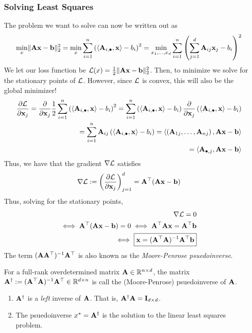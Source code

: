     \subsubsection{Solving Least Squares}
        The problem we want to solve can now be written out as
        \begin{align*}
            \min_x \lVert \mathbf{A}\mathbf{x} - {\bf b} \rVert_2^2 = \min_x \sum_{i=1}^n \left( \langle \mathbf{A}_{i, \bullet}, \mathbf{x} \rangle - b_i\right)^2 = \min_{x_1, \dots, x_d} \sum_{i =1}^n \left( \sum_{j = 1}^d \mathbf{A}_{ij}\mathbf{x}_j - b_i \right)^2
        \end{align*}
        We let our loss function be $\mathcal{L}(x) = \frac{1}{2} \lVert \mathbf{A}\mathbf{x} - {\bf b} \rVert_2^2$. Then, to minimize we solve for the stationary points of $\mathcal{L}$. However, since $\mathcal{L}$ is convex, this will also be the global minimizer!
        \begin{align*}
            \frac{\partial \mathcal{L}}{\partial \mathbf{x}_j} = \frac{\partial}{\partial \mathbf{x}_j} \frac{1}{2} \sum_{i = 1}^n \left( \langle \mathbf{A}_{i, \bullet}, \mathbf{x} \rangle - b_i \right)^2 
            = \sum_{i = 1}^n \left( \langle \mathbf{A}_{i, \bullet}, \mathbf{x} \rangle - b_i \right) \frac{\partial}{\partial \mathbf{x}_j} \left( \langle \mathbf{A}_{i, \bullet}, \mathbf{x} \rangle - b_i \right) \\
            =  \sum_{i = 1}^n \mathbf{A}_{ij} \left( \langle \mathbf{A}_{i, \bullet}, \mathbf{x} \rangle - b_i \right) = \langle \left( \mathbf{A}_{1j}, \dots, \mathbf{A}_{nj} \right), \mathbf{A}\mathbf{x} - {\bf b} \rangle \\ = \langle \mathbf{A}_{\bullet, j}, \mathbf{A}\mathbf{x} - {\bf b} \rangle
        \end{align*}
        Thus, we have that the gradient $\nabla \mathcal{L}$ satisfies
        \begin{equation}
        \label{eqn:leastsq:grad}
            \nabla \mathcal{L} := \left( \frac{\partial \mathcal{L}}{\partial \mathbf{x}_j}\right)_{j = 1}^d = \mathbf{A}^\top(\mathbf{A}\mathbf{x} - {\bf b})
        \end{equation}
        Thus, solving for the stationary points,
        \begin{align*}
            \nabla \mathcal{L} = 0 \\
            \iff \mathbf{A}^\top (\mathbf{A}\mathbf{x} - {\bf b}) = 0 \iff \mathbf{A}^\top \mathbf{A}\mathbf{x} = \mathbf{A}^\top {\bf b} \\
            \iff \boxed{\mathbf{x} = (\mathbf{A}^\top \mathbf{A})^{-1} \mathbf{A}^\top {\bf b}}
        \end{align*}
        The term $(\mathbf{A} \mathbf{A}^\top)^{-1}\mathbf{A}^\top$ is also known as the {\em Moore-Penrose psuedoinverse}.
        \begin{defn}
        For a full-rank overdetermined matrix $\mathbf{A} \in \mathbb{R}^{n \times d}$, the matrix $\mathbf{A}^\dagger := (\mathbf{A}^\top \mathbf{A})^{-1}\mathbf{A}^\top \in \mathbb{R}^{d \times n}$ is call the (Moore-Penrose) psuedoinverse of $\mathbf{A}$.
        \begin{enumerate}
            \item $\mathbf{A}^\dagger$ is a {\em left} inverse of $\mathbf{A}$. That is, $\mathbf{A}^\dagger \mathbf{A} = \mathbf{I}_{d \times d}$.
            \item The psuedoinverse $x^* = \mathbf{A}^\dagger$ is the solution to the linear least squares problem.
        \end{enumerate}
        \end{defn}
